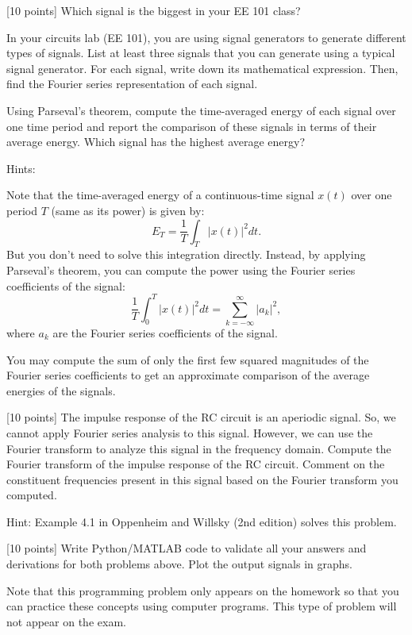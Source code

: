 \documentclass{ee102_pset}
\begin{document}
[10 points] Which signal is the biggest in your EE 101 class? 

In your circuits lab (EE 101), you are using signal generators to generate different types of signals. List at least three signals that you can generate using a typical signal generator. For each signal, write down its mathematical expression. Then, find the Fourier series representation of each signal.

Using Parseval's theorem, compute the time-averaged energy of each signal over one time period and report the comparison of these signals in terms of their average energy. Which signal has the highest average energy? 

{\color{blue}
Hints:

Note that the time-averaged energy of a continuous-time signal $x(t)$ over one period $T$ (same as its power) is given by:
\[
E_T = \frac{1}{T} \int_{T} |x(t)|^2 dt.
\]
But you don't need to solve this integration directly. Instead, by applying Parseval's theorem, you can compute the power using the Fourier series coefficients of the signal:
\[
\frac{1}{T} \int_{0}^{T} |x(t)|^2 dt = \sum_{k=-\infty}^{\infty} |a_k|^2,
\]
where $a_k$ are the Fourier series coefficients of the signal.

You may compute the sum of only the first few squared magnitudes of the Fourier series coefficients to get an approximate comparison of the average energies of the signals. 
}

[10 points] The impulse response of the RC circuit is an aperiodic signal. So, we cannot apply Fourier series analysis to this signal. However, we can use the Fourier transform to analyze this signal in the frequency domain. Compute the Fourier transform of the impulse response of the RC circuit. Comment on the constituent frequencies present in this signal based on the Fourier transform you computed.

{\color{blue} Hint: Example 4.1 in Oppenheim and Willsky (2nd edition) solves this problem.}

[10 points] Write Python/MATLAB code to validate all your answers and derivations for both problems above. Plot the output signals in graphs.  

{\color{blue}Note that this programming problem only appears on the homework so that you can practice these concepts using computer programs. This type of problem will not appear on the exam.}
\end{document}
